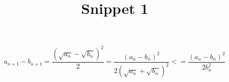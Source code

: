 \documentclass[10pt]{article} %
\title{Snippet 1}
\begin{document}
\maketitle

\begin{equation*}
	a_{n+1}-b_{n+1}=\frac{\left( \sqrt{a_n}-\sqrt{b_n} \right)^2}{2}=\frac{\left( a_n-b_n \right)^2}{2\left( 
		\sqrt{a_n}+\sqrt{b_n}\right)^2}<=\frac{\left( a_n-b_n \right)^2}{2b_n^2}
\end{equation*}
\end{document}
